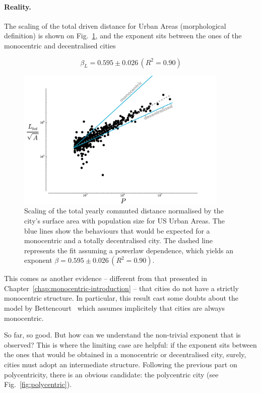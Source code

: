 \paragraph{Reality. } The scaling of the total driven distance for Urban Areas
(morphological definition) is shown on
Fig.~\ref{fig:scaling_Ltot_norm}, and the exponent sits between the ones of the
monocentric and decentralised cities

\begin{equation*}
    \boxed{\beta_L =  0.595 \pm 0.026\, (R^2 = 0.90)}
\end{equation*}


\begin{figure}
    \centering
    \includegraphics[width=0.9\textwidth]{gfx/chapter-scaling/scaling_commuting_norm.pdf}
    \caption{Scaling of the total yearly commuted distance normalised by the
    city's surface area with population size for US Urban Areas. The blue lines
show the behaviours that would be expected for a monocentric and a totally
decentralised city. The dashed line represents the fit assuming a powerlaw
dependence, which yields an exponent $\beta =  0.595 \pm 0.026\, (R^2 =
0.90)$.\label{fig:scaling_Ltot_norm}}
    
\end{figure}

This comes as another evidence -- different from that presented in
Chapter~\ref{chap:monocentric-introduction} -- that cities do not have a
strictly monocentric structure. In particular, this result cast some doubts
about the model by Bettencourt~\cite{Bettencourt:2013} which assumes implicitely that cities are always
monocentric. 

So far, so good. But how can we understand the non-trivial exponent that is observed? This is
where the limiting case are helpful: if the exponent sits between the ones that
would be obtained in a monocentric or decentralised city, surely, cities must
adopt an intermediate structure. Following the previous part on polycentricity,
there is an obvious candidate: the polycentric city (see
Fig.~\ref{fig:polycentric}).

